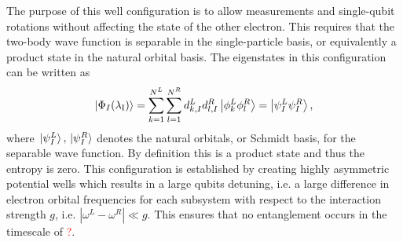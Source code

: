 \documentclass[twocolumn,superscriptaddress,unsortedaddress,
 amsmath,amssymb,
 aps,
]{revtex4-2}
\begin{document}
        The purpose of this well configuration is to allow measurements and single-qubit rotations without affecting the state of the other electron. This requires that the two-body wave function is separable in the single-particle basis, or equivalently a product state in the natural orbital basis. The eigenstates in this configuration can be written as
        \begin{align*}
            \ket{\Phi_I(\lambda_\mathrm{I})}
            = \sum_{k = 1}^{N^L} \sum_{l = 1}^{N^R}
            d^L_{k, I} d^{R}_{l, I}
            \ket{\phi^L_k \phi^R_l}
            = \ket{\psi^L_I \psi^{R}_I},
        \end{align*}
        where $\ket*{\psi^L_I}, \ket*{\psi^R_I}$ denotes the natural orbitals, or
        Schmidt basis, for the separable wave function. By definition this is a product state and thus the entropy is zero. This configuration is established by creating highly asymmetric potential wells which results in a large qubits detuning, i.e. a large difference in electron orbital frequencies for each subsystem with respect to the interaction strength $g$, i.e. $|\omega^L-\omega^R| \ll g$. This ensures that no entanglement occurs in the timescale of \textcolor{red}{?}.  %
\end{document}
